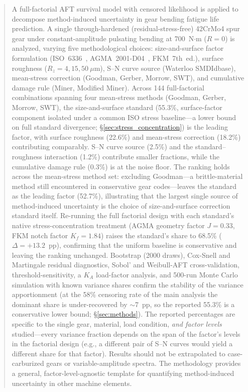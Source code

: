 \documentclass[twocolumn,12pt,a4paper]{article}
\begin{document}
\begin{abstract}
\label{sec:abstract}

A full-factorial AFT survival model with censored likelihood is
applied to decompose method-induced uncertainty in gear bending fatigue
life prediction. A single through-hardened (residual-stress-free)
42CrMo4 spur gear under constant-amplitude pulsating bending at
700~N$\cdot$m ($R=0$) is analyzed, varying five methodological choices:
size-and-surface factor formulation (ISO~6336~\cite{iso6336}, AGMA~2001-D04~\cite{agma2001},
FKM~7th~ed.), surface roughness ($R_z=4,15,50~\mu$m), S--N curve
source (Waterloo SMDIdbase), mean-stress correction (Goodman, Gerber,
Morrow, SWT), and cumulative damage rule (Miner, Modified Miner).
Across 144 full-factorial combinations spanning four mean-stress
methods (Goodman, Gerber, Morrow, SWT), the size-and-surface standard
(55.3\%, surface-factor component isolated under a common ISO stress %
baseline---a lower bound on full standard divergence;
\S\ref{sec:stress_concentration}) is the leading factor, with
surface roughness (22.6\%) and mean-stress correction (18.2\%) %
contributing comparably. S--N curve source (2.5\%) and the %
standard--roughness interaction (1.2\%) contribute smaller fractions, %
while the cumulative damage rule (0.3\%) is at the noise floor. The %
ranking holds across the mean-stress method
set: excluding Goodman---a brittle-material method still encountered
in conservative gear codes---leaves the standard as the leading
factor (52.7\%), illustrating that the largest single source of
method-induced uncertainty is the choice of size-and-surface
correction standard itself. Re-running the full factorial design with
each standard's native stress-concentration treatment (AGMA geometry
factor $J=0.33$, FKM notch factor $K_f=1.84$) raises the standard's
share to 68.5\% ($\Delta=+13.2$~pp), confirming that the uniform
baseline is conservative and leaving the ranking unchanged.
Bootstrap (2000 draws), Cox-Snell and Martingale
residual diagnostics, Sobol' and Weibull-AFT cross-validation,
threshold-sensitivity, a $K_A$ load-factor analysis, and 500-run %
Monte Carlo simulation with known variance shares confirm
the stability of the variance apportionment (at the 58\% censoring
rate of the main analysis the dominant share is under-recovered by
$\sim$7~pp, so the reported 55.3\% is a conservative lower bound;
\S\ref{sec:methods}).
The reported percentages are specific to the single gear, material, load
condition, \emph{and factor levels} studied---every variance fraction
depends on the span of the factor's levels in the factorial design
(e.g., a different pair of S--N curves would yield a different share
for that factor). Results should not be extrapolated to case-carburized
gears or variable-amplitude spectra. The methodology provides a
general, factor-level-agnostic template for quantifying
method-induced uncertainty in other machine elements.


\end{abstract}
\end{document}
